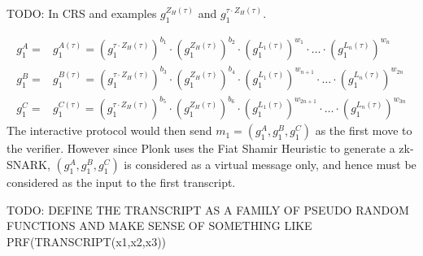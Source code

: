 TODO: In CRS and examples $g_1^{Z_H(\tau)}$ and $g_1^{\tau\cdot Z_H(\tau)}$.

\begin{equation}
\begin{array}{rl}
g_1^A = & g_1^{A(\tau)} = \left(g_1^{\tau\cdot Z_H(\tau)}\right)^{b_1}\cdot\left(g_1^{Z_H(\tau)}\right)^{b_2}\cdot \left(g_1^{L_1(\tau)}\right)^{w_1}\cdot\ldots\cdot \left(g_1^{L_n(\tau)}\right)^{w_n}\\
g_1^B = & g_1^{B(\tau)} = \left(g_1^{\tau\cdot Z_H(\tau)}\right)^{b_3}\cdot\left(g_1^{Z_H(\tau)}\right)^{b_4}\cdot \left(g_1^{L_1(\tau)}\right)^{w_{n+1}}\cdot\ldots\cdot \left(g_1^{L_n(\tau)}\right)^{w_{2n}}\\
g_1^C = & g_1^{C(\tau)} = \left(g_1^{\tau\cdot Z_H(\tau)}\right)^{b_5}\cdot\left(g_1^{Z_H(\tau)}\right)^{b_6}\cdot \left(g_1^{L_1(\tau)}\right)^{w_{2n+1}}\cdot\ldots\cdot \left(g_1^{L_n(\tau)}\right)^{w_{3n}}
\end{array}
\end{equation}
The interactive protocol would then send $m_1=(g_1^A, g_1^B, g_1^C)$ as the first move to the verifier. However since Plonk uses the Fiat Shamir Heuristic to generate a zk-SNARK, $(g_1^A, g_1^B, g_1^C)$ is considered as a virtual message only, and hence must be considered as the input to the first transcript.

TODO: DEFINE THE TRANSCRIPT AS A FAMILY OF PSEUDO RANDOM FUNCTIONS AND MAKE SENSE OF SOMETHING LIKE PRF(TRANSCRIPT(x1,x2,x3))
\begin{example}[3-fac]

\end{example}



